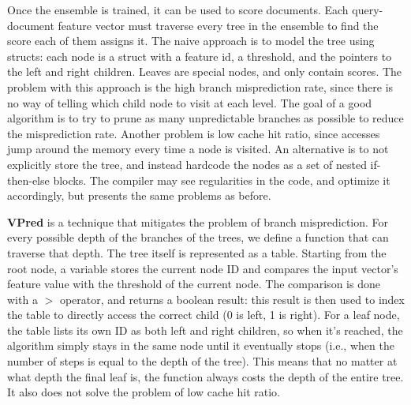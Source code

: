 Once the ensemble is trained, it can be used to score documents. Each query-document feature vector must traverse every tree in the ensemble to find the score each of them assigns it. The naive approach is to model the tree using structs: each node is a struct with a feature id, a threshold, and the pointers to the left and right children. Leaves are special nodes, and only contain scores. The problem with this approach is the high branch misprediction rate, since there is no way of telling which child node to visit at each level. The goal of a good algorithm is to try to prune as many unpredictable branches as possible to reduce the misprediction rate. Another problem is low cache hit ratio, since accesses jump around the memory every time a node is visited. An alternative is to not explicitly store the tree, and instead hardcode the nodes as a set of nested if-then-else blocks. The compiler may see regularities in the code, and optimize it accordingly, but presents the same problems as before.

\textbf{VPred} is a technique that mitigates the problem of branch misprediction. For every possible depth of the branches of the trees, we define a function that can traverse that depth. The tree itself is represented as a table. Starting from the root node, a variable stores the current node ID and compares the input vector's feature value with the threshold of the current node. The comparison is done with a $>$ operator, and returns a boolean result: this result is then used to index the table to directly access the correct child (0 is left, 1 is right). For a leaf node, the table lists its own ID as both left and right children, so when it's reached, the algorithm simply stays in the same node until it eventually stops (i.e., when the number of steps is equal to the depth of the tree). This means that no matter at what depth the final leaf is, the function always costs the depth of the entire tree. It also does not solve the problem of low cache hit ratio.

